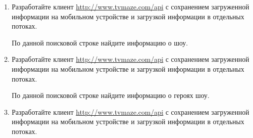 \begin{enumerate}


	\item Разработайте клиент \url{http://www.tvmaze.com/api} с сохранением загруженной информации на мобильном устройстве и загрузкой
		информации в отдельных потоках.

		По данной поисковой строке найдите информацию о шоу.

	\item Разработайте клиент \url{http://www.tvmaze.com/api} с сохранением загруженной информации на мобильном устройстве и загрузкой
		информации в отдельных потоках.

		По данной поисковой строке найдите информацию о героях шоу.

	\item Разработайте клиент \url{http://www.tvmaze.com/api} с сохранением загруженной информации на мобильном устройстве и загрузкой
		информации в отдельных потоках.


\end{enumerate}
